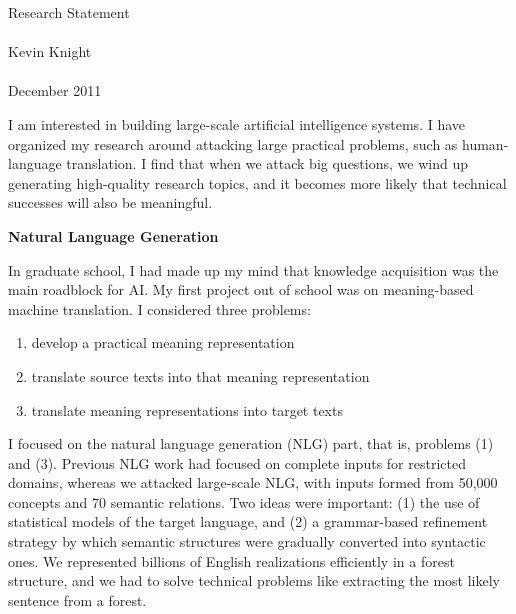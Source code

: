 



\newcommand{\hd}[1]{
\vspace*{0.3in} 
\noindent 
{\bf \Large #1}
\hspace{0.1in}
\vspace*{0.2in}}



\begin{Large}
\begin{center}
Research Statement \\
\hspace{1mm} \\
Kevin Knight \\
\hspace{1mm} \\
December 2011
\end{center}
\end{Large}

\vspace{0.1in}

\noindent
I am interested in building large-scale artificial intelligence 
systems.  I have organized my research around attacking large
practical problems, such as human-language translation.  I find that
when we attack big questions, we wind up generating high-quality
research topics, and it becomes more likely that technical
successes will also be meaningful.

\hd{Natural Language Generation}

In graduate school, I had made up my mind that knowledge acquisition 
was the main roadblock for AI.  My first project out of school was on 
meaning-based machine translation.  I considered three problems: 

\begin{enumerate}
\item develop a practical meaning representation
\item translate source texts into that meaning representation
\item translate meaning representations into target texts
\end{enumerate}

\noindent 
I focused on the 
natural language generation (NLG) part, that is, problems (1) and 
(3).  Previous NLG work had focused on complete inputs for restricted 
domains, whereas we attacked large-scale NLG, with inputs formed from
50,000 concepts and 70 semantic relations.  Two ideas were 
important: (1) the use of statistical models of the target language, 
and (2) a grammar-based refinement strategy by which semantic 
structures were gradually converted into syntactic ones.  We 
represented billions of English realizations efficiently in a forest 
structure, and we had to solve technical problems like extracting the 
most likely sentence from a forest.

